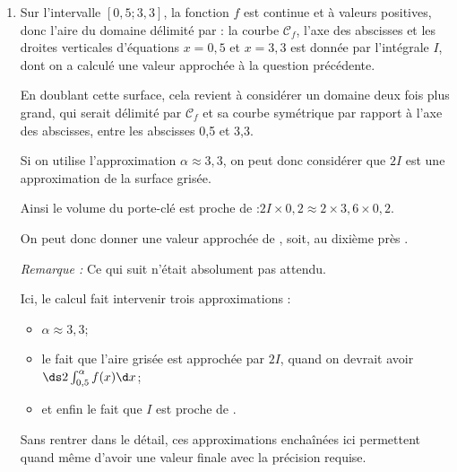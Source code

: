 \begin{enumerate}
		Comme on a :\quad $I= 0,5\e^{2} - 3,3\e^{-3,6}\approx 3,6$\quad au dixième près, on arrive bien à l'arrondi annoncé.

		\item Sur l'intervalle $[0,5 ; 3,3]$, la fonction $f$ est continue et à valeurs positives, donc l'aire du domaine délimité par : la courbe $\mathcal{C}_f$, l'axe des abscisses et les droites verticales d'équations $x = 0,5$ et $x = 3,3$ est donnée par l'intégrale $I$, dont on a calculé une valeur approchée à la question précédente.

		En doublant cette surface, cela revient à considérer un domaine deux fois plus grand, qui serait délimité par $\mathcal{C}_f$ et sa courbe symétrique par rapport à l'axe des abscisses, entre les abscisses 0,5 et 3,3.

		Si on utilise l'approximation $\alpha \approx 3,3$, on peut donc considérer que $2I$ est une approximation de la surface grisée.

		Ainsi le volume du porte-clé est proche de :\quad $2I \times 0,2 \approx 2 \times 3,6 \times 0,2$.

		On peut donc donner une valeur approchée de , soit, au dixième près .

		\emph{Remarque :} Ce qui suit n'était absolument pas attendu.

	 Ici, le calcul fait intervenir trois approximations :
	 \begin{itemize}
	 	\item $\alpha \approx 3,3$;
	 	\item le fait que l'aire grisée est approchée par $2I$, quand on devrait avoir \quad $\ds 2\int_{0,5}^{\alpha} f(x) \d x$;
	 	\item et enfin le fait que $I$ est proche de .
	 \end{itemize}

		Sans rentrer dans le détail, ces approximations enchaînées ici permettent quand même d'avoir une valeur finale avec la précision requise.
	\end{enumerate}
